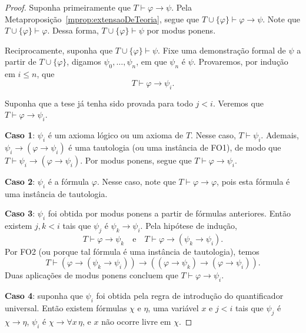 \begin{proof}
    Suponha primeiramente que $T\vdash \varphi\rightarrow\psi$.
    Pela Metaproposição~\ref{mprop:extensaoDeTeoria}, segue que $T\cup\{\varphi\}\vdash \varphi\rightarrow\psi$.
    Note que $T\cup\{\varphi\}\vdash \varphi$.
    Dessa forma, $T\cup\{\varphi\}\vdash \psi$ por modus ponens.
    
    Reciprocamente, suponha que $T\cup\{\varphi\}\vdash \psi$.
    Fixe uma demonstração formal de $\psi$ a partir de $T\cup\{\varphi\}$, digamos $\psi_0,\dots,\psi_n$, em que $\psi_n$ é $\psi$.
    Provaremos, por indução em $i\leq n$, que
    \[
        T\vdash \varphi\rightarrow\psi_i.
    \]

    Suponha que a tese já tenha sido provada para todo $j<i$.
    Veremos que $T\vdash \varphi\rightarrow\psi_i$.

    \textbf{Caso 1}: $\psi_i$ é um axioma lógico ou um axioma de $T$.
    Nesse caso, $T\vdash \psi_i$.
    Ademais, $\psi_i\rightarrow(\varphi\rightarrow\psi_i)$ é uma tautologia (ou uma instância de FO1), de modo que $T\vdash \psi_i\rightarrow(\varphi\rightarrow\psi_i)$.
    Por modus ponens, segue que $T\vdash \varphi\rightarrow\psi_i$.
    
    \textbf{Caso 2}: $\psi_i$ é a fórmula $\varphi$.
    Nesse caso, note que $T\vdash \varphi\rightarrow\varphi$, pois esta fórmula é uma instância de tautologia.

    \textbf{Caso 3}: $\psi_i$ foi obtida por modus ponens a partir de fórmulas anteriores.
    Então existem $j,k<i$ tais que $\psi_j$ é $\psi_k\rightarrow\psi_i$.
    Pela hipótese de indução,
    \[
        T\vdash \varphi\rightarrow\psi_k \quad \text{e}\quad T\vdash \varphi\rightarrow(\psi_k\rightarrow\psi_i).
    \]
    Por FO2 (ou porque tal fórmula é uma instância de tautologia), temos
    \[
        T\vdash (\varphi\rightarrow(\psi_k\rightarrow\psi_i))
        \rightarrow
        ((\varphi\rightarrow\psi_k)\rightarrow(\varphi\rightarrow\psi_i)).
    \]
    Duas aplicações de modus ponens concluem que $T\vdash \varphi\rightarrow\psi_i$.

    \textbf{Caso 4}: suponha que $\psi_i$ foi obtida pela regra de introdução do quantificador universal.
    Então existem fórmulas $\chi$ e $\eta$, uma variável $x$ e $j<i$ tais que $\psi_j$ é $\chi\rightarrow\eta$, $\psi_i$ é $\chi\rightarrow\forall x\,\eta$, e $x$ não ocorre livre em $\chi$.


\end{proof}
